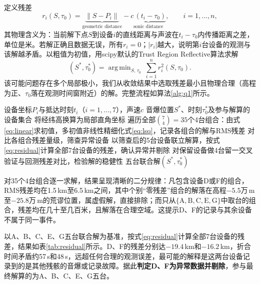 \documentclass[draft,12pt,a4paper]{ctexart}
\theoremstyle{definition}
\DeclareMathOperator*{\argmin}{arg\,min}
\begin{document}
定义残差
\begin{equation}
  r_i(S,\tau_0)=\underbrace{\|S-P_i\|}_{\text{geometric distance}}-\underbrace{c\,(t_i-\tau_0)}_{\text{sonic distance}},\qquad i=1,\dots,n,
  \label{eq:residual}
\end{equation}
其物理含义为：当前解下点$S$到设备$i$的直线距离与声波在$t_i-\tau_0$内传播距离之差，单位是米。若解正确且数据无误，所有$r_i=0$；$|r_i|$越大，说明第$i$台设备的观测与该解越矛盾。以粗值为初值，用scipy默认的Trust Region Reflective算法求解
\begin{equation}
  (S^{*},\tau_0^{*})=\argmin_{S,\,\tau_0}\ \sum_{i=1}^{n} r_i^2(S,\tau_0).
  \label{eq:lsq}
\end{equation}
该可能问题存在多个局部极小，我们从收敛结果中选取残差最小且物理合理（高程为正、$\tau_0$落在观测时间窗附近）的解。完整流程如算法\ref{alg:q1}所示。

\begin{algorithm}[H]
\caption{问题一求解流程}\label{alg:q1}
\begin{algorithmic}[1]
\Require 设备坐标$P_i$与抵达时刻$t_i$（$i=1,\dots,7$），声速$c$
\Ensure 音爆位置$S^{*}$、时刻$\tau_0^{*}$及参与解算的设备集合
\State 将经纬高换算为局部直角坐标
\State 遍历全部$\binom{7}{4}=35$个4台组合：由式\eqref{eq:linear}求初值，多初值非线性精细化式\eqref{eq:lsq}，记录各组合的解与RMS残差
\State 对比各组合残差量级，筛查异常设备
\State 以筛查后的5台设备联立解算，按式\eqref{eq:residual}计算全部7台设备的残差，确认异常并剔除
\State 对保留设备做4台留一交叉验证与回测残差对比，检验解的稳健性
\State \Return 五台联合解$(S^{*},\tau_0^{*})$
\end{algorithmic}
\end{algorithm}

对35个4台组合逐一求解，结果呈现清晰的二分规律：凡包含设备D或F的组合，RMS残差均在1.5\,km至6.5\,km之间，其中个别``零残差''组合的解落在高程$-5.5$万\,m至$-25.8$万\,m的荒谬位置，属虚假解，直接排除；而只从$\{\mathrm{A,B,C,E,G}\}$中取台的组合，残差均在几十至几百米，且解落在合理空域。这提示D、F的记录与其余设备不属于同一事件。

以A、B、C、E、G五台联合解为基准，按式\eqref{eq:residual}计算全部7台设备的残差，结果如表\ref{tab:residual}所示。D、F的残差分别达$-19.4$\,km和$-16.2$\,km，折合时间矛盾约57\,s和48\,s，远超任何合理的观测误差，最可能的解释是这两台设备记录到的是其他残骸的音爆或记录故障。据此\textbf{判定D、F为异常数据并剔除}，参与最终解算的为A、B、C、E、G五台。
\end{document}
